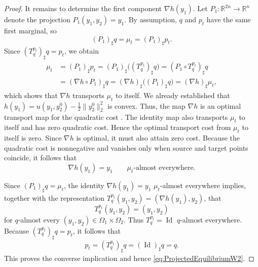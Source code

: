 \documentclass[10pt,a4paper]{amsart}
\newcommand{\R}{\mathbb{R}}
\begin{document}
\begin{proof}
It remains to determine the first component $\nabla h(y_1)$. Let
$P_1:\R^{2n}\to\R^n$ denote the projection
$P_1(y_1,y_2)=y_1$. By assumption, $q$ and $p_t$ have the same first
marginal, so
\[
    (P_1)_\sharp q
    =
    \mu_t
    =
    (P_1)_\sharp p_t.
\]
Since $(T_q^{p_t})_\sharp q=p_t$, we obtain
\begin{align*}
    \mu_t
    &=
    (P_1)_\sharp p_t= (P_1)_\sharp\bigl((T_q^{p_t})_\sharp q\bigr)=
    (P_1\circ T_q^{p_t})_\sharp q\\
    &=
    (\nabla h\circ P_1)_\sharp q=
    (\nabla h)_\sharp\bigl((P_1)_\sharp q\bigr)=
    (\nabla h)_\sharp\mu_t,
\end{align*}
which shows that $\nabla h$ transports $\mu_t$ to itself. We already established that  $h(y_1)=u(y_1,y_2^0)-\frac12\|y_2^0\|_2^2$ is convex. Thus, the map $\nabla h$ is an optimal transport map for the quadratic cost \cite[Theorem~2.13]{Ambrosio2013}. The identity map also transports $\mu_t$ to itself and has zero quadratic cost. Hence the optimal transport cost from $\mu_t$ to itself is zero. Since $\nabla h$ is optimal, it must also attain zero cost. Because the quadratic cost is nonnegative and vanishes only when source and target points coincide, it follows that
\[
    \nabla h(y_1)=y_1
    \qquad
    \mu_t\text{-almost everywhere}.
\]

Since $(P_1)_\sharp q=\mu_t$, the identity $\nabla h(y_1)=y_1$ $\mu_t$-almost everywhere implies, together with the representation $T_q^{p_t}(y_1,y_2)=(\nabla h(y_1),y_2)$, that
\[
    T_q^{p_t}(y_1,y_2) = (y_1,y_2)
\]
for $q$-almost every $(y_1,y_2)\in\Omega_1\times\Omega_2$. Thus $T_q^{p_t}=\operatorname{Id}$ $q$-almost everywhere. Because  $(T_q^{p_t})_\sharp q=p_t$, it follows that
\[
p_t = (T_q^{p_t})_\sharp q = (\operatorname{Id})_\sharp q= q.
\]
This proves the converse implication and hence \eqref{eq:ProjectedEquilibriumW2}.
\end{proof}
\end{document}

